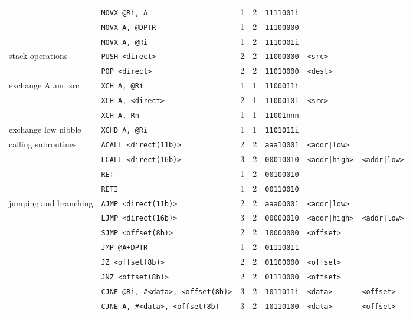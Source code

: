 \documentclass[journal]{IEEEtran}
\begin{document}
{{\begin{tabular}{|l|l|l|l|l|l|l|}
		& \texttt{MOVX @Ri, A} & 1 & 2 & \texttt{1111001i} & & \\
		& \texttt{MOVX A, @DPTR} & 1 & 2 & \texttt{11100000} & & \\
		& \texttt{MOVX A, @Ri} & 1 & 2 & \texttt{1110001i} & & \\
		\hline
		\multirow{2}{*}{stack operations}
		& \texttt{PUSH <direct>} & 2 & 2 & \texttt{11000000} & \texttt{<src>} & \\
		& \texttt{POP <direct>} & 2 & 2 & \texttt{11010000} & \texttt{<dest>} & \\
		\hline
		\multirow{3}{*}{exchange A and src}
		& \texttt{XCH A, @Ri} & 1 & 1 & \texttt{1100011i} & & \\
		& \texttt{XCH A, <direct>} & 2 & 1 & \texttt{11000101} & \texttt{<src>} & \\
		& \texttt{XCH A, Rn} & 1 & 1 & \texttt{11001nnn} & & \\
		\hline
		exchange low nibble
		& \texttt{XCHD A, @Ri} & 1 & 1 & \texttt{1101011i} & & \\
		\hline
		\multirow{4}{*}{calling subroutines}
		& \texttt{ACALL <direct(11b)>} & 2 & 2 & \texttt{aaa10001} & \texttt{<addr|low>} & \\
		& \texttt{LCALL <direct(16b)>} & 3 & 2 & \texttt{00010010} & \texttt{<addr|high>} & \texttt{<addr|low>} \\
		& \texttt{RET} & 1 & 2 & \texttt{00100010} & & \\
		& \texttt{RETI} & 1 & 2 & \texttt{00110010} & & \\
		\hline
		\multirow{12}{*}{jumping and branching}
		& \texttt{AJMP <direct(11b)>} & 2 & 2 & \texttt{aaa00001} & \texttt{<addr|low>} & \\
		& \texttt{LJMP <direct(16b)>} & 3 & 2 & \texttt{00000010} & \texttt{<addr|high>} & \texttt{<addr|low>} \\
		& \texttt{SJMP <offset(8b)>} & 2 & 2 & \texttt{10000000} & \texttt{<offset>} & \\
		& \texttt{JMP @A+DPTR} & 1 & 2 & \texttt{01110011} & & \\
		& \texttt{JZ <offset(8b)>} & 2 & 2 & \texttt{01100000} & \texttt{<offset>} & \\
		& \texttt{JNZ <offset(8b)>} & 2 & 2 & \texttt{01110000} & \texttt{<offset>} & \\
		& \texttt{CJNE @Ri, \#<data>, <offset(8b)>} & 3 & 2 & \texttt{1011011i} & \texttt{<data>} & \texttt{<offset>} \\
		& \texttt{CJNE A, \#<data>, <offset(8b)} & 3 & 2 & \texttt{10110100} & \texttt{<data>} & \texttt{<offset>} \\

\end{tabular}}}
\end{document}
